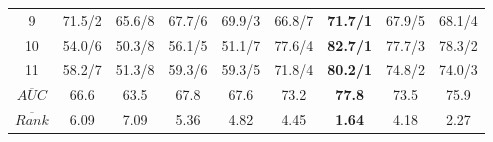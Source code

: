\documentclass[review]{elsarticle}
\begin{document}
\begin{table}[h]
\begin{tabular}{|c|c|c|c|c|c|c|c|c|}
9 & 71.5/2 & 65.6/8 & 67.7/6 & 69.9/3 & 66.8/7 & \textbf{71.7/1} & 67.9/5 & 68.1/4 \\

10 & 54.0/6 & 50.3/8 & 56.1/5 & 51.1/7 & 77.6/4 & \textbf{82.7/1} & 77.7/3 & 78.3/2 \\

11 & 58.2/7 & 51.3/8 & 59.3/6 & 59.3/5 & 71.8/4 & \textbf{80.2/1} & 74.8/2 & 74.0/3 \\

\hline
$\overline{AUC}$ & 66.6	& 63.5 & 67.8 &	67.6 & 73.2 & \textbf{77.8} & 73.5 & 75.9 \\


$\overline{Rank}$ & 6.09 & 7.09 &  5.36 & 4.82 & 4.45 & \textbf{1.64} & 4.18 & 2.27 \\
 \hline 
\end{tabular}
\label{tab:cdnk-biogps}
\end{table}
\end{document}
